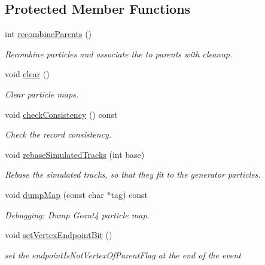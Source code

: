 \subsection*{Protected Member Functions}
\begin{DoxyCompactItemize}
\item 
int \hyperlink{class_d_d4hep_1_1_simulation_1_1_geant4_particle_handler_a828738c3b9ec35cff6ea6fc659b6df4a}{recombine\+Parents} ()
\begin{DoxyCompactList}\small\item\em Recombine particles and associate the to parents with cleanup. \end{DoxyCompactList}\item 
void \hyperlink{class_d_d4hep_1_1_simulation_1_1_geant4_particle_handler_a3d3d90e1e70f18337199c27da300c75d}{clear} ()
\begin{DoxyCompactList}\small\item\em Clear particle maps. \end{DoxyCompactList}\item 
void \hyperlink{class_d_d4hep_1_1_simulation_1_1_geant4_particle_handler_a9eaea81103cfd2b7ede33538ea1391f4}{check\+Consistency} () const
\begin{DoxyCompactList}\small\item\em Check the record consistency. \end{DoxyCompactList}\item 
void \hyperlink{class_d_d4hep_1_1_simulation_1_1_geant4_particle_handler_a27443ebbf322d022c1dc8337e02f089b}{rebase\+Simulated\+Tracks} (int base)
\begin{DoxyCompactList}\small\item\em Rebase the simulated tracks, so that they fit to the generator particles. \end{DoxyCompactList}\item 
void \hyperlink{class_d_d4hep_1_1_simulation_1_1_geant4_particle_handler_aa1c03db235f55f52a150a2849d7aa882}{dump\+Map} (const char $\ast$tag) const
\begin{DoxyCompactList}\small\item\em Debugging\+: Dump Geant4 particle map. \end{DoxyCompactList}\item 
void \hyperlink{class_d_d4hep_1_1_simulation_1_1_geant4_particle_handler_a1e75f073fa789609d31025fa7af977e8}{set\+Vertex\+Endpoint\+Bit} ()
\begin{DoxyCompactList}\small\item\em set the endpoint\+Is\+Not\+Vertex\+Of\+Parent\+Flag at the end of the event \end{DoxyCompactList}\end{DoxyCompactItemize}
